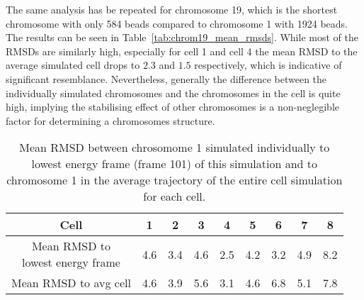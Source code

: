 The same analysis has be repeated for chromosome 19, which is the shortest chromosome with only 584 beads compared to chromosome 1 with 1924 beads. The results can be seen in Table~\ref{tab:chrom19_mean_rmsds}. While most of the RMSDs are similarly high, especially for cell 1 and cell 4 the mean RMSD to the average simulated cell drops to \(2.3\) and \(1.5\) respectively, which is indicative of significant resemblance. Nevertheless, generally the difference between the individually simulated chromosomes and the chromosomes in the cell is quite high, implying the stabilising effect of other chromosomes is a non-neglegible factor for determining a chromosomes structure.

\begin{table}[ht]
\centering
  \caption{Mean RMSD between chrosomome 1 simulated individually to lowest energy frame (frame 101) of this simulation and to chromosome 1 in the average trajectory of the entire cell simulation for each cell.}
  \label{tab:chrom1_mean_rmsds}
  \begin{tabular}{c @{\phantom{abc}} S S S S S S S S}
  \toprule
    Cell & 1 & 2 & 3 & 4 & 5 & 6 & 7 & 8 \\
  \midrule
    \parbox{4cm}{\centering Mean RMSD to \\ lowest energy frame} & 4.6 & 3.4 & 4.6 & 2.5 & 4.2 & 3.2 & 4.9 & 8.2 \\
    Mean RMSD to avg cell & 4.6 & 3.9 & 5.6 & 3.1 & 4.6 & 6.8 & 5.1 & 7.8 \\
  \bottomrule
  \end{tabular}
\end{table}

